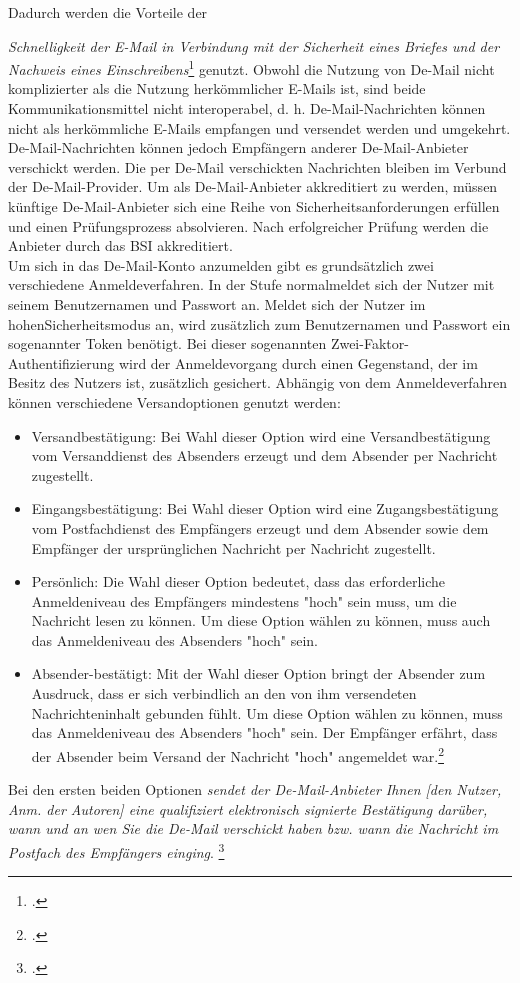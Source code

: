 \documentclass  [paper=a4,
				fontsize=12pt,
				listof=totoc,
				bibliography=totoc
				]{scrreprt}
\begin{document}
			Dadurch werden die Vorteile der {\textit{\glqq Schnelligkeit der E-Mail in Verbindung mit der Sicherheit eines Briefes und der Nachweis eines Einschreibens\grqq}\footcite[Vgl.][S. 8]{BSIDeMail} genutzt.
			Obwohl die Nutzung von De-Mail nicht komplizierter als die Nutzung herkömmlicher E-Mails ist, sind beide Kommunikationsmittel nicht interoperabel, d. h. De-Mail-Nachrichten können nicht als herkömmliche E-Mails empfangen und versendet werden und umgekehrt.
			De-Mail-Nachrichten können jedoch Empfängern anderer De-Mail-Anbieter verschickt werden.
			Die per De-Mail verschickten Nachrichten bleiben im Verbund der De-Mail-Provider.
			Um als De-Mail-Anbieter akkreditiert zu werden, müssen künftige De-Mail-Anbieter sich eine Reihe von Sicherheitsanforderungen erfüllen und einen Prüfungsprozess absolvieren.
			Nach erfolgreicher Prüfung werden die Anbieter durch das \ac{BSI} akkreditiert.\medskip\\
			
			Um sich in das De-Mail-Konto anzumelden gibt es grundsätzlich zwei verschiedene Anmeldeverfahren.
			In der Stufe \glqq normal\grqq meldet sich der Nutzer mit seinem Benutzernamen und Passwort an.
			Meldet sich der Nutzer im \glqq hohen\grqq Sicherheitsmodus an, wird zusätzlich zum Benutzernamen und Passwort ein sogenannter Token benötigt.
			Bei dieser sogenannten Zwei-Faktor-Authentifizierung wird der Anmeldevorgang durch einen Gegenstand, der im Besitz des Nutzers ist, zusätzlich gesichert.
			Abhängig von dem Anmeldeverfahren können verschiedene Versandoptionen genutzt werden:
			
			\begin{itemize}
				\item Versandbestätigung: Bei Wahl dieser Option wird eine Versandbestätigung vom Versanddienst des Absenders erzeugt und dem Absender per Nachricht zugestellt.
				\item Eingangsbestätigung: Bei Wahl dieser Option wird eine Zugangsbestätigung vom Postfachdienst des Empfängers erzeugt und dem Absender sowie dem Empfänger der ursprünglichen Nachricht per Nachricht zugestellt.
				\item Persönlich: Die Wahl dieser Option bedeutet, dass das erforderliche Anmeldeniveau des Empfängers mindestens "hoch" sein muss, um die Nachricht lesen zu können. Um diese Option wählen zu können, muss auch das Anmeldeniveau des Absenders "hoch" sein.
				\item Absender-bestätigt: Mit der Wahl dieser Option bringt der Absender zum Ausdruck, dass er sich verbindlich an den von ihm versendeten Nachrichteninhalt gebunden fühlt. Um diese Option wählen zu können, muss das Anmeldeniveau des Absenders "hoch" sein. Der Empfänger erfährt, dass der Absender beim Versand der Nachricht "hoch" angemeldet war.\footcite[Vgl.][]{BSIMerkmale}
			\end{itemize}
			Bei den ersten beiden Optionen \textit{\glqq sendet der De-Mail-Anbieter Ihnen [den Nutzer, Anm. der Autoren] eine qualifiziert elektronisch signierte Bestätigung darüber, wann und an wen Sie die De-Mail verschickt haben bzw. wann die Nachricht im Postfach des Empfängers einging\grqq}. \footcite[Vgl.][S. 15]{BSIDeMail}\medskip\\
			
}
\end{document}
